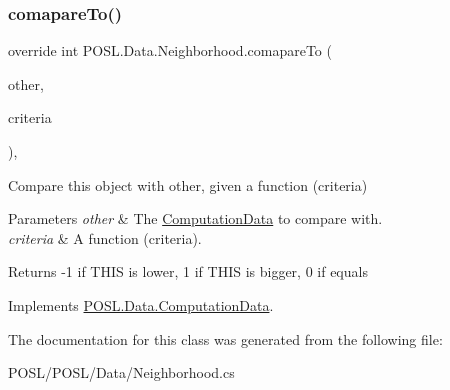 \subsubsection{\texorpdfstring{comapare\+To()}{comapareTo()}}
{\footnotesize\ttfamily override int P\+O\+S\+L.\+Data.\+Neighborhood.\+comapare\+To (\begin{DoxyParamCaption}\item[{\hyperlink{classPOSL_1_1Data_1_1ComputationData}{Computation\+Data}}]{other,  }\item[{Func$<$ \hyperlink{classPOSL_1_1Data_1_1ComputationData}{Computation\+Data}, int $>$}]{criteria }\end{DoxyParamCaption})\hspace{0.3cm}{\ttfamily [inline]}, {\ttfamily [virtual]}}



Compare this object with other, given a function (criteria) 


\begin{DoxyParams}{Parameters}
{\em other} & The \hyperlink{classPOSL_1_1Data_1_1ComputationData}{Computation\+Data} to compare with. \\
\hline
{\em criteria} & A function (criteria). \\
\hline
\end{DoxyParams}
\begin{DoxyReturn}{Returns}
-\/1 if T\+H\+IS is lower, 1 if T\+H\+IS is bigger, 0 if equals 
\end{DoxyReturn}


Implements \hyperlink{classPOSL_1_1Data_1_1ComputationData_a6cca889bb4ce32104d91dba413ef8c56}{P\+O\+S\+L.\+Data.\+Computation\+Data}.



The documentation for this class was generated from the following file\+:\begin{DoxyCompactItemize}
\item 
P\+O\+S\+L/\+P\+O\+S\+L/\+Data/Neighborhood.\+cs\end{DoxyCompactItemize}
